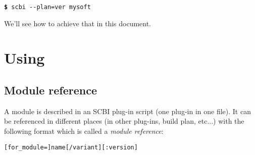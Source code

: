 \documentclass[a4paper,12pt,twoside]{article}
\newcommand{\code}[1]{\texttt{#1}}
\renewcommand{\emph}[1]{\textit{#1}}
\newcommand{\cmd}[1]{\tabto{1cm}\hspace{0.5cm}\texttt{\textbf{\$} #1}}
\let\stdsection\section
\renewcommand\section{\newpage\stdsection}
\newcommand{\ddash}{-{}-}
\begin{document}
\cmd{scbi \ddash{}plan=ver mysoft}

We'll see how to achieve that in this document.


\section{Using}

\subsection{Module reference}
\label{modref}

A module is described in an SCBI plug-in script (one plug-in in one file). It can be referenced in different places (in other plug-ins, build plan, etc...) with the following format which is called a \emph{module reference}:

\code{[for\_module=]name[/variant][:version]}
\label{dev}
\end{document}
